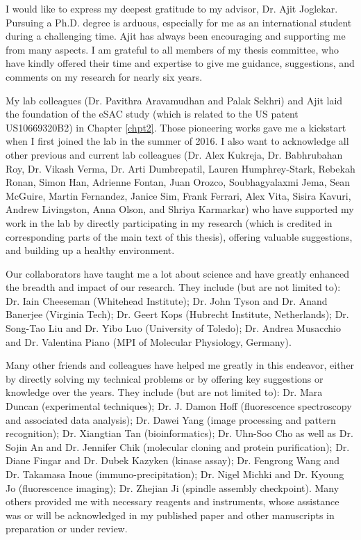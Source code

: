 I would like to express my deepest gratitude to my advisor, Dr. Ajit Joglekar. Pursuing a Ph.D. degree is arduous, especially for me as an international student during a challenging time. Ajit has always been encouraging and supporting me from many aspects. I am grateful to all members of my thesis committee, who have kindly offered their time and expertise to give me guidance, suggestions, and comments on my research for nearly six years.

My lab colleagues (Dr. Pavithra Aravamudhan and Palak Sekhri) and Ajit laid the foundation of the eSAC study (which is related to the US patent US10669320B2) in Chapter \ref{chpt2}. Those pioneering works gave me a kickstart when I first joined the lab in the summer of 2016. I also want to acknowledge all other previous and current lab colleagues (Dr. Alex Kukreja, Dr. Babhrubahan Roy, Dr. Vikash Verma, Dr. Arti Dumbrepatil, Lauren Humphrey-Stark, Rebekah Ronan, Simon Han, Adrienne Fontan, Juan Orozco, Soubhagyalaxmi Jema, Sean McGuire, Martin Fernandez, Janice Sim, Frank Ferrari, Alex Vita, Sisira Kavuri, Andrew Livingston, Anna Olson, and Shriya Karmarkar) who have supported my work in the lab by directly participating in my research (which is credited in corresponding parts of the main text of this thesis), offering valuable suggestions, and building up a healthy environment.

Our collaborators have taught me a lot about science and have greatly enhanced the breadth and impact of our research. They include (but are not limited to): Dr. Iain Cheeseman (Whitehead Institute); Dr. John Tyson and Dr. Anand Banerjee (Virginia Tech); Dr. Geert Kops (Hubrecht Institute, Netherlands); Dr. Song-Tao Liu and Dr. Yibo Luo (University of Toledo); Dr. Andrea Musacchio and Dr. Valentina Piano (MPI of Molecular Physiology, Germany).

Many other friends and colleagues have helped me greatly in this endeavor, either by directly solving my technical problems or by offering key suggestions or knowledge over the years. They include (but are not limited to): Dr. Mara Duncan (experimental techniques); Dr. J. Damon Hoff (fluorescence spectroscopy and associated data analysis); Dr. Dawei Yang (image processing and pattern recognition); Dr. Xiangtian Tan (bioinformatics); Dr. Uhn-Soo Cho as well as Dr. Sojin An and Dr. Jennifer Chik (molecular cloning and protein purification); Dr. Diane Fingar and Dr. Dubek Kazyken (kinase assay); Dr. Fengrong Wang and Dr. Takamasa Inoue (immuno-precipitation); Dr. Nigel Michki and Dr. Kyoung Jo (fluorescence imaging); Dr. Zhejian Ji (spindle assembly checkpoint). Many others provided me with necessary reagents and instruments, whose assistance was or will be acknowledged in my published paper \cite{eSAC} and other manuscripts in preparation or under review.

